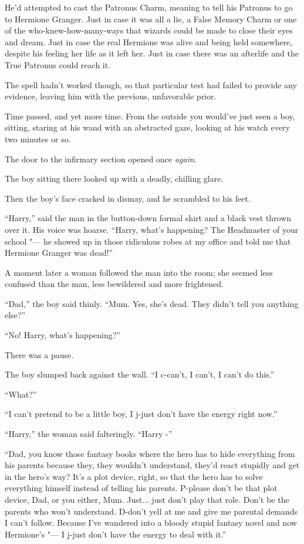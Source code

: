 He'd attempted to cast the Patronus Charm, meaning to tell his Patronus
to go to Hermione Granger. Just in case it was all a lie, a False Memory
Charm or one of the who-knew-how-many-ways that wizards could be made to
close their eyes and dream. Just in case the real Hermione was alive and
being held somewhere, despite his feeling her life as it left her. Just
in case there was an afterlife and the True Patronus could reach it.

The spell hadn't worked though, so that particular test had failed to
provide any evidence, leaving him with the previous, unfavorable prior.

Time passed, and yet more time. From the outside you would've just seen
a boy, sitting, staring at his wand with an abstracted gaze, looking at
his watch every two minutes or so.

The door to the infirmary section opened once \emph{again}.

The boy sitting there looked up with a deadly, chilling glare.

Then the boy's face cracked in dismay, and he scrambled to his feet.

``Harry,'' said the man in the button-down formal shirt and a black vest
thrown over it. His voice was hoarse. ``Harry, what's happening? The
Headmaster of your school "--- he showed up in those ridiculous robes at my
office and told me that Hermione Granger was dead!''

A moment later a woman followed the man into the room; she seemed less
confused than the man, less bewildered and more frightened.

``Dad,'' the boy said thinly. ``Mum. Yes, she's dead. They didn't tell
you anything else?''

``No! Harry, what's happening?''

There was a pause.

The boy slumped back against the wall. ``I c-can't, I can't, I can't do
this.''

``What?''

``I can't pretend to be a little boy, I j-just don't have the energy
right now.''

``Harry,'' the woman said falteringly. ``Harry -''

``Dad, you know those fantasy books where the hero has to hide
everything from his parents because they, they wouldn't understand,
they'd react stupidly and get in the hero's way? It's a plot device,
right, so that the hero has to solve everything himself instead of
telling his parents. P-please don't be that plot device, Dad, or you
either, Mum. Just... just don't play that role. Don't be the
parents who won't understand. D-don't yell at me and give me parental
demands I can't follow. Because I've wandered into a bloody stupid
fantasy novel and now Hermione's "--- I j-just don't have the energy to
deal with it.''


